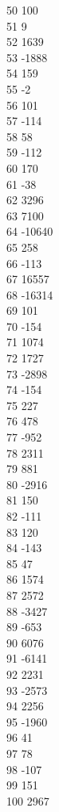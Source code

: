 { 50	100 \\
 51	9 \\
 52	1639 \\
 53	-1888 \\
 54	159 \\
 55	-2 \\
 56	101 \\
 57	-114 \\
 58	58 \\
 59	-112 \\
 60	170 \\
 61	-38 \\
 62	3296 \\
 63	7100 \\
 64	-10640 \\
 65	258 \\
 66	-113 \\
 67	16557 \\
 68	-16314 \\
 69	101 \\
 70	-154 \\
 71	1074 \\
 72	1727 \\
 73	-2898 \\
 74	-154 \\
 75	227 \\
 76	478 \\
 77	-952 \\
 78	2311 \\
 79	881 \\
 80	-2916 \\
 81	150 \\
 82	-111 \\
 83	120 \\
 84	-143 \\
 85	47 \\
 86	1574 \\
 87	2572 \\
 88	-3427 \\
 89	-653 \\
 90	6076 \\
 91	-6141 \\
 92	2231 \\
 93	-2573 \\
 94	2256 \\
 95	-1960 \\
 96	41 \\
 97	78 \\
 98	-107 \\
 99	151 \\
 100	2967 \\
}

